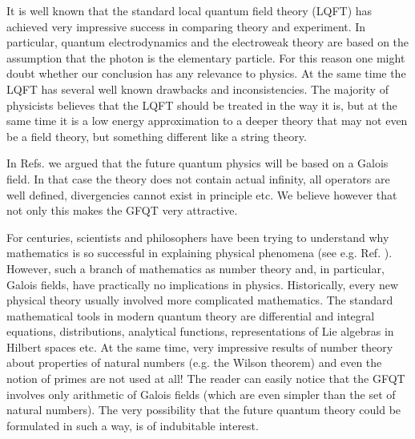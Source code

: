 \documentclass[a4paper,12pt]{article}%
\begin{document}
It is well
known that the standard local quantum field theory (LQFT)
has achieved very impressive success in comparing theory 
and experiment. In particular, quantum 
electrodynamics and the electroweak theory are based
on the assumption that the photon is the elementary
particle. For this reason one might doubt whether our
conclusion has any relevance to physics. At the same time
the LQFT has several well known 
drawbacks and inconsistencies. The majority of physicists
believes that \cite{Wein} the LQFT
should be treated \coordHE{}in the way it is\coordHE{}, but at the same
time it is \cite{Wein} a \coordHE{}low energy approximation to a
deeper theory that may not even be a field theory, but 
something different like a string theory\coordHE{}.  

In Refs. \cite{lev1,lev2} we argued that the future quantum
physics will be based on a Galois field. In that case the
theory does not contain actual infinity, all operators are
well defined, divergencies cannot exist in principle etc.
We believe however that not only this makes the GFQT very 
attractive.

For centuries, scientists and philosophers have been trying to
understand why mathematics is so successful in explaining
physical phenomena (see e.g. Ref. \cite{Wigner1}). However,
such a branch of mathematics as number theory and, in 
particular, Galois fields, have practically no implications 
in physics.
Historically, every new physical theory usually involved
more complicated mathematics. The standard mathematical
tools in modern quantum theory are differential and
integral equations, distributions, analytical functions,
representations of Lie algebras in Hilbert spaces etc.
At the same time, very impressive results of number theory
about properties of natural numbers (e.g. the Wilson theorem)
and even the notion of primes are not used at all!
The reader can easily notice that the GFQT involves only 
arithmetic of Galois fields (which are even simpler than
the set of natural numbers). The very possibility that 
the future quantum theory could be formulated in such a way,
is of indubitable interest. 
\end{document}

